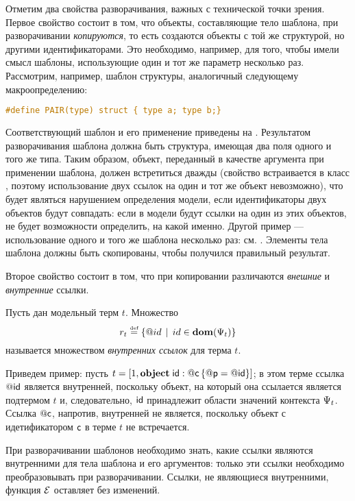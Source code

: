 Отметим два свойства разворачивания, важных с технической точки зрения. Первое свойство состоит в том, что объекты, составляющие тело шаблона, при разворачивании \emph{копируются}, то есть создаются объекты с той же структурой, но другими идентификаторами. Это необходимо, например, для того, чтобы имели смысл шаблоны, использующие один и тот же параметр несколько раз. Рассмотрим, например, шаблон структуры, аналогичный следующему макроопределению:
\begin{lstlisting}[language=C]
#define PAIR(type) struct { type a; type b;}
\end{lstlisting}
%
%
Соответствующий шаблон и его применение приведены на . Результатом разворачивания шаблона должна быть структура, имеющая два поля одного и того же типа. Таким образом, объект, переданный в качестве аргумента при применении шаблона, должен встретиться дважды (свойство  встраивается в класс , поэтому использование двух ссылок на один и тот же объект невозможно), что будет являться нарушением определения модели, если идентификаторы двух объектов будут совпадать: если в модели будут ссылки на один из этих объектов, не будет возможности определить, на какой именно. Другой пример --- использование одного и того же шаблона несколько раз: см. . Элементы тела шаблона должны быть скопированы, чтобы получился правильный результат.

Второе свойство состоит в том, что при копировании различаются \emph{внешние} и \emph{внутренние} ссылки.
\begin{Def}
Пусть дан модельный терм $t$. Множество 
$$
r_t \stackrel{\text{\tiny def}}{=} \left\{ @id \;\,|\;\, id \in \mathbf{dom}(\Psi_t) \right\}
$$
называется множеством \emph{внутренних ссылок} для терма $t$.
\end{Def}
Приведем пример: пусть 
$t = \left[1, \mathbf{object}\;\mathsf{id} : @\mathsf{c}\left\{ @\mathsf{p} = @\mathsf{id} \right\}\right]$; в этом терме ссылка $@\mathsf{id}$ является внутренней, поскольку объект, на который она ссылается является подтермом $t$ и, следовательно, $\mathsf{id}$ принадлежит области значений контекста $\Psi_t$. Ссылка $@\mathsf{c}$, напротив, внутренней не является, поскольку объект с идетификатором $\mathsf{c}$ в терме $t$ не встречается.

При разворачивании шаблонов необходимо знать, какие ссылки являются внутренними для тела шаблона и его аргументов: только эти ссылки необходимо преобразовывать при разворачивании. Ссылки, не являющиеся внутренними, функция $\mathcal{E}$ оставляет без изменений.

